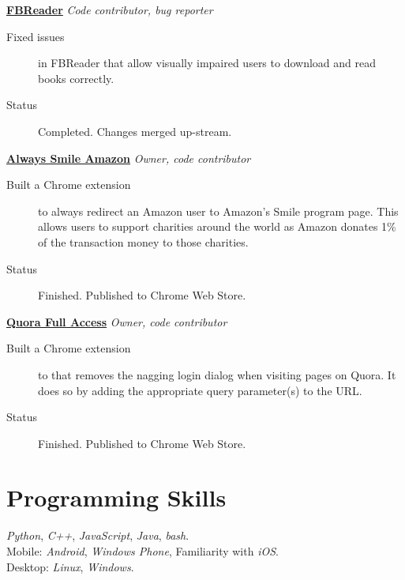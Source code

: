 \documentclass[margin,line]{resume}
\begin{document}
\begin{resume}
\textbf{\href{https://github.com/aawc/FBReaderJ}{FBReader}} \hfill \textsl{Code contributor, bug reporter}\\
\begin{description}
\item [Fixed issues] in FBReader that allow visually impaired users to download and read books correctly.
\item [Status] Completed. Changes merged up-stream.
  \end{description}

\textbf{\href{https://github.com/aawc/AlwaysSmileAmazon}{Always Smile Amazon}} \hfill \textsl{Owner, code contributor}\\
\begin{description}
\item [Built a Chrome extension] to always redirect an Amazon user to Amazon's Smile program page. This allows users to support charities around the world as Amazon donates 1\% of the transaction money to those charities.
\item [Status] Finished. Published to Chrome Web Store.
  \end{description}

\textbf{\href{https://github.com/aawc/QuoraFullAccess}{Quora Full Access}} \hfill \textsl{Owner, code contributor}\\
\begin{description}
\item [Built a Chrome extension] to that removes the nagging login dialog when visiting pages on Quora. It does so by adding the appropriate query parameter(s) to the URL.
\item [Status] Finished. Published to Chrome Web Store.
  \end{description}

\section{Programming Skills}
  \textit{Python}, \textit{C++}, \textit{JavaScript}, \textit{Java}, \textit{bash}.\\
Mobile: \textit{Android}, \textit{Windows Phone}, Familiarity with \textit{iOS}.\\
Desktop: \textit{Linux}, \textit{Windows}.


\end{resume}
\end{document}
